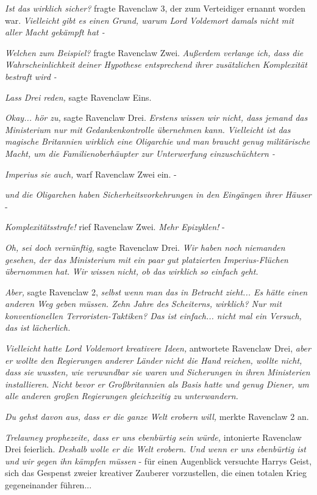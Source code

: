 \emph{Ist das wirklich sicher?} fragte Ravenclaw 3, der zum Verteidiger ernannt
worden war. \emph{Vielleicht gibt es einen Grund, warum Lord Voldemort damals
nicht mit aller Macht gekämpft hat - }

\emph{Welchen zum Beispiel?} fragte Ravenclaw Zwei. \emph{Außerdem verlange ich,
dass die Wahrscheinlichkeit deiner Hypothese entsprechend ihrer zusätzlichen
Komplexität bestraft wird - }

\emph{Lass Drei reden,} sagte Ravenclaw Eins.

\emph{Okay... hör zu, }sagte Ravenclaw Drei. \emph{Erstens wissen wir nicht,
dass jemand das Ministerium nur mit Gedankenkontrolle übernehmen kann.
Vielleicht ist das magische Britannien wirklich eine Oligarchie und man braucht
genug militärische Macht, um die Familienoberhäupter zur Unterwerfung
einzuschüchtern - }

\emph{Imperius sie auch, }warf Ravenclaw Zwei ein. -

\emph{und die Oligarchen haben Sicherheitsvorkehrungen in den Eingängen ihrer
Häuser} -

\emph{Komplexitätsstrafe! }rief Ravenclaw Zwei. \emph{Mehr Epizyklen!} -

\emph{Oh, sei doch vernünftig,} sagte Ravenclaw Drei. \emph{Wir haben noch
niemanden gesehen, der das Ministerium mit ein paar gut platzierten
Imperius-Flüchen übernommen hat. }\emph{Wir wissen nicht, ob das wirklich so
einfach geht. }

\emph{Aber,} sagte Ravenclaw 2, \emph{selbst wenn man das in Betracht zieht...
Es hätte einen anderen Weg geben müssen. Zehn Jahre des Scheiterns, wirklich?
Nur mit konventionellen Terroristen-Taktiken? Das ist einfach... nicht mal ein
Versuch, das ist lächerlich.}

\emph{Vielleicht hatte Lord Voldemort kreativere Ideen,} antwortete Ravenclaw
Drei,\emph{ aber er wollte den Regierungen anderer Länder nicht die Hand
reichen, wollte nicht, dass} \emph{sie wussten, wie verwundbar sie waren und
Sicherungen in ihren Ministerien installieren}. \emph{Nicht bevor er
Großbritannien als Basis hatte und genug Diener, um alle anderen großen
Regierungen gleichzeitig zu unterwandern. }

\emph{Du gehst davon aus, dass er die ganze Welt erobern will, }merkte Ravenclaw
2 an.

\emph{Trelawney prophezeite, dass er uns ebenbürtig sein würde, }intonierte
Ravenclaw Drei feierlich. \emph{Deshalb wolle er die Welt erobern. Und wenn er
uns ebenbürtig ist und wir gegen ihn kämpfen müssen }- für einen Augenblick
versuchte Harrys Geist, sich das Gespenst zweier kreativer Zauberer
vorzustellen, die einen totalen Krieg gegeneinander führen...


